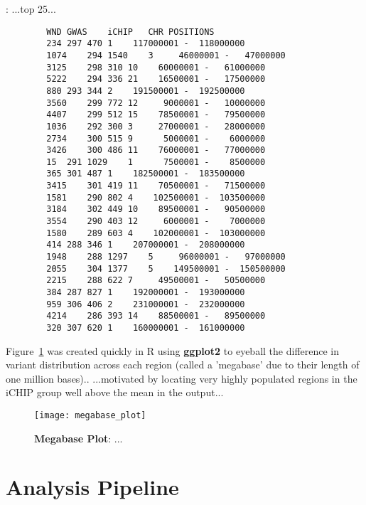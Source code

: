 \begin{listing}[H]
    \caption[results]{: ...top 25...}
    \label{list:results}
    \begin{verbatim}
        WND	GWAS	iCHIP	CHR	POSITIONS
        234	297	470	1	 117000001 -  118000000
        1074	294	1540	3	  46000001 -   47000000
        3125	298	310	10	  60000001 -   61000000
        5222	294	336	21	  16500001 -   17500000
        880	293	344	2	 191500001 -  192500000
        3560	299	772	12	   9000001 -   10000000
        4407	299	512	15	  78500001 -   79500000
        1036	292	300	3	  27000001 -   28000000
        2734	300	515	9	   5000001 -    6000000
        3426	300	486	11	  76000001 -   77000000
        15	291	1029	1	   7500001 -    8500000
        365	301	487	1	 182500001 -  183500000
        3415	301	419	11	  70500001 -   71500000
        1581	290	802	4	 102500001 -  103500000
        3184	302	449	10	  89500001 -   90500000
        3554	290	403	12	   6000001 -    7000000
        1580	289	603	4	 102000001 -  103000000
        414	288	346	1	 207000001 -  208000000
        1948	288	1297	5	  96000001 -   97000000
        2055	304	1377	5	 149500001 -  150500000
        2215	288	622	7	  49500001 -   50500000
        384	287	827	1	 192000001 -  193000000
        959	306	406	2	 231000001 -  232000000
        4214	286	393	14	  88500001 -   89500000
        320	307	620	1	 160000001 -  161000000
    \end{verbatim}
\end{listing}

Figure~\ref{fig:megabaseplot} was created quickly in R using \textbf{ggplot2} to
eyeball the difference in variant distribution across each region (called
a 'megabase' due to their length of one million bases)..
...motivated by locating very highly populated regions in the iCHIP group well
above the mean in the output...

\begin{figure}[htbp!]
    \centering
    \texttt{[image: megabase\_plot]}
    \caption[megabaseplot]{\textbf{Megabase Plot}: ...}
    \label{fig:megabaseplot}
\end{figure}


\chapter{Analysis Pipeline}

